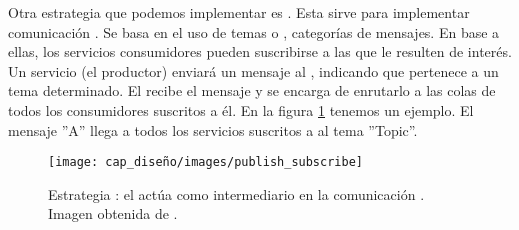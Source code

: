 Otra estrategia que podemos implementar es \textbf{}. Esta sirve para implementar comunicación . \cite{royChapterMessagePatterns2017} Se basa en el uso de temas o \textbf{}, categorías de mensajes. En base a ellas, los servicios consumidores pueden suscribirse a las que le resulten de interés. Un servicio (el productor) enviará un mensaje al , indicando que pertenece a un tema determinado. El  recibe el mensaje y se encarga de enrutarlo a las colas de todos los consumidores suscritos a él. \cite{rabbitmqPublishSubscribeDocumentation} En la figura \ref{fig:publish-subscribe} tenemos un ejemplo. El mensaje ''A'' llega a todos los servicios suscritos a al tema ''Topic''.

\begin{figure}[htb]
  \centering
  \texttt{[image: cap\_diseño/images/publish\_subscribe]}
  \caption[Estrategia : el  actúa como intermediario en la comunicación .]{Estrategia : el  actúa como intermediario en la comunicación . Imagen obtenida de \footnotemark.}
  \label{fig:publish-subscribe}
\end{figure}


